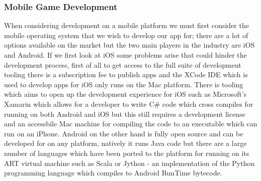 \documentclass{article}
\begin{document}
	\subsubsection{Mobile Game Development}
	When considering development on a mobile platform we must first consider the mobile operating system that we wish to develop our app for; there are a lot of options available on the market but the two main players in the industry are iOS and Android. If we first look at iOS some problems arise that could hinder the development process, first of all to get access to the full suite of development tooling there is a subscription fee to publish apps and the XCode IDE which is used to develop  apps for iOS only runs on the Mac platform. There is tooling which aims to open up the development experience for iOS such as Microsoft's Xamarin\cite{Xamarin} which allows for a developer to write C\# code which cross compiles for running on both Android and iOS but this still requires a development license and an accessbile Mac machine for compiling the code to an executable which can run on an iPhone. Android on the other hand is fully open source and can be developed for on any platform, natively it runs Java code but there are a large number of languages which have been ported to the platform for running on its ART virtual machine such as Scala or Jython - an implementation of the Python programming language which compiles to Android RunTime bytecode.
\end{document}
